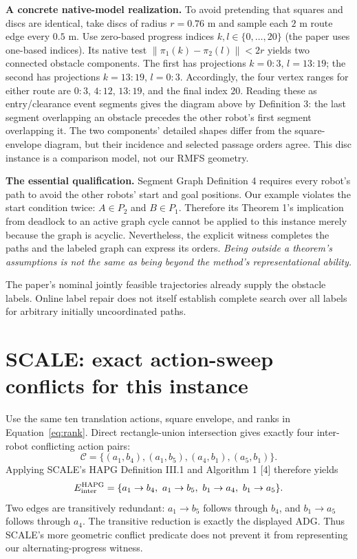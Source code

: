 \documentclass[11pt,a4paper]{article}
\begin{document}
\textbf{A concrete native-model realization.} To avoid pretending that squares
and discs are identical, take discs of radius $r=0.76$ m and sample each $2$ m
route edge every $0.5$ m. Use zero-based progress indices $k,l\in\{0,\ldots,20\}$
(the paper uses one-based indices). Its native test
$\|\pi_1(k)-\pi_2(l)\|<2r$ yields two connected obstacle components.
The first has projections $k=0{:}3$, $l=13{:}19$; the second has projections
$k=13{:}19$, $l=0{:}3$. Accordingly, the four vertex ranges for either route
are $0{:}3$, $4{:}12$, $13{:}19$, and the final index $20$.
Reading these as entry/clearance event segments gives the diagram above by
Definition 3: the last segment overlapping an obstacle precedes the other
robot's first segment overlapping it. The two components' detailed shapes differ
from the square-envelope diagram, but their incidence and selected passage
orders agree. This disc instance is a comparison model, not our RMFS geometry.

\textbf{The essential qualification.} Segment Graph Definition 4 requires every
robot's path to avoid the other robots' start and goal positions. Our example
violates the start condition twice: $A\in P_2$ and $B\in P_1$.
Therefore its Theorem 1's implication from deadlock to an active graph cycle
cannot be applied to this instance merely because the graph is acyclic.
Nevertheless, the explicit witness completes the paths and the labeled graph
can express its orders. \emph{Being outside a theorem's assumptions is not the
same as being beyond the method's representational ability.}

The paper's nominal jointly feasible trajectories already supply the obstacle
labels. Online label repair does not itself establish complete search over all
labels for arbitrary initially uncoordinated paths.

\clearpage
\section{SCALE: exact action-sweep conflicts for this instance}
Use the same ten translation actions, square envelope, and ranks in
Equation~\eqref{eq:rank}. Direct rectangle-union intersection gives exactly four
inter-robot conflicting action pairs:
\begin{equation}
\mathcal C=\{(a_1,b_4),(a_1,b_5),(a_4,b_1),(a_5,b_1)\}.
\end{equation}
Applying SCALE's HAPG Definition III.1 and Algorithm 1 [4] therefore yields
\begin{equation}
E_{\rm inter}^{\rm HAPG}=\{a_1\to b_4,\ a_1\to b_5,\ b_1\to a_4,\ b_1\to a_5\}.
\end{equation}
Two edges are transitively redundant: $a_1\to b_5$ follows through $b_4$,
and $b_1\to a_5$ follows through $a_4$. The transitive reduction is exactly
the displayed ADG. Thus SCALE's more geometric conflict predicate does not
prevent it from representing our alternating-progress witness.
\end{document}
